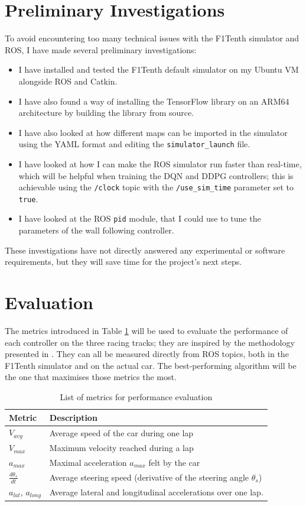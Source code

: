 \section{Preliminary Investigations}
\label{preli}
To avoid encountering too many technical issues with the F1Tenth simulator and ROS, I have made several preliminary investigations: 
\begin{itemize}
	\item I have installed and tested the F1Tenth default simulator on my Ubuntu VM alongside ROS and Catkin.
	\item I have also found a way of installing the TensorFlow library on an ARM64 architecture by building the library from source. 
	\item I have also looked at how different maps can be imported in the simulator using the YAML format and editing the \verb |simulator_launch| file.
	\item I have looked at how I can make the ROS simulator run faster than real-time, which will be helpful when training the DQN and DDPG controllers; this is achievable using the \verb |/clock| topic with the \verb |/use_sim_time| parameter set to \verb |true|.
	\item I have looked at the ROS \verb|pid| module, that I could use to tune the parameters of the wall following controller.
\end{itemize}


These investigations have not directly answered any experimental or software requirements, but they will save time for the project's next steps.

\section{Evaluation}
\label{eva}

The metrics introduced in Table \ref{table:1} will be used to evaluate the performance of each controller on the three racing tracks; they are inspired by the methodology presented in \cite{benchmark}. They can all be measured directly from ROS topics, both in the F1Tenth simulator and on the actual car. The best-performing algorithm will be the one that maximises those metrics the most.

\begin{table}[H]
\centering
\begin{tabularx}{\textwidth}{||l X||}
 \hline
 Metric & Description\\ [0.5ex] 
 \hline\hline
 $V_{avg}$ & Average speed of the car during one lap \\ 
 $V_{max}$ & Maximum velocity reached during a lap \\
 ${a_{max}}$ & Maximal acceleration ${a_{max}}$ felt by the car \\
 $\frac{d\theta_s}{dt}$ & Average steering speed (derivative of the steering angle $\theta_s$) \\
 $a_{lat}$, $a_{long}$  & Average lateral and longitudinal accelerations over one lap. \\ [1ex] 
 \hline
\end{tabularx}
\caption{List of metrics for performance evaluation}
\label{table:1}
\end{table}

